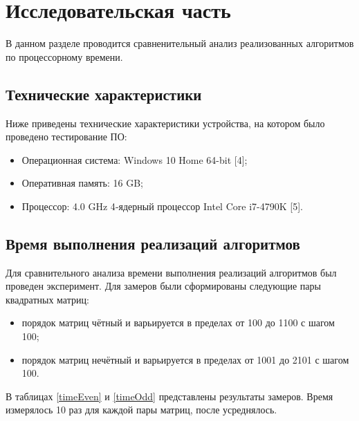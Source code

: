 \documentclass[12pt]{report}
\begin{document}
\newpage

\chapter{Исследовательская часть}

В данном разделе проводится сравненительный анализ реализованных алгоритмов по процессорному времени.

\section{Технические характеристики}

Ниже приведены технические характеристики устройства, на котором было проведено тестирование ПО:

\begin{itemize}
	\item Операционная система: Windows 10 Home 64-bit [4];
	\item Оперативная память: 16 GB;
	\item Процессор: 4.0 GHz 4‑ядерный процессор Intel Core i7-4790K [5].

\end{itemize}

\section{Время выполнения реализаций алгоритмов}

Для сравнительного анализа времени выполнения реализаций алгоритмов был проведен эксперимент. Для замеров были сформированы следующие пары квадратных матриц:
\begin{itemize}
	\item порядок матриц чётный и варьируется в пределах от 100 до 1100 с шагом 100;
	\item порядок матриц нечётный и варьируется в пределах от 1001 до 2101 с шагом 100.
\end{itemize}

В таблицах \ref{timeEven} и \ref{timeOdd} представлены результаты замеров. Время измерялось 10 раз для каждой пары матриц, после усреднялось. 
\end{document}
